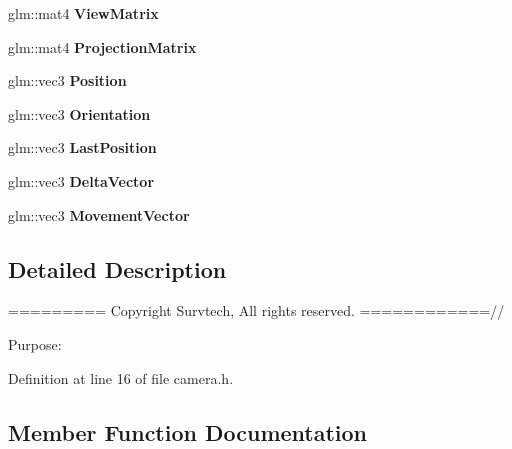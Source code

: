 \begin{DoxyCompactItemize}
\item 
glm\+::mat4 {\bfseries View\+Matrix}\hypertarget{class_camera_a34f22e4635ee38206e4b9c59095d43bf}{}\label{class_camera_a34f22e4635ee38206e4b9c59095d43bf}

\item 
glm\+::mat4 {\bfseries Projection\+Matrix}\hypertarget{class_camera_a8f5424b6795715c8a44805d1c3a5b11c}{}\label{class_camera_a8f5424b6795715c8a44805d1c3a5b11c}

\item 
glm\+::vec3 {\bfseries Position}\hypertarget{class_camera_a9733b59f5340f6f1bca24d52a6679039}{}\label{class_camera_a9733b59f5340f6f1bca24d52a6679039}

\item 
glm\+::vec3 {\bfseries Orientation}\hypertarget{class_camera_ab998c79a8bcbd71dcaad201f536e36e1}{}\label{class_camera_ab998c79a8bcbd71dcaad201f536e36e1}

\item 
glm\+::vec3 {\bfseries Last\+Position}\hypertarget{class_camera_a274def711ceb63556a3074da11fb43df}{}\label{class_camera_a274def711ceb63556a3074da11fb43df}

\item 
glm\+::vec3 {\bfseries Delta\+Vector}\hypertarget{class_camera_a92ea5380dd9962b451e067fe1c3c81dc}{}\label{class_camera_a92ea5380dd9962b451e067fe1c3c81dc}

\item 
glm\+::vec3 {\bfseries Movement\+Vector}\hypertarget{class_camera_a0d450752f3639989bc813bb077dd9f13}{}\label{class_camera_a0d450752f3639989bc813bb077dd9f13}

\end{DoxyCompactItemize}


\subsection{Detailed Description}
========= Copyright Survtech, All rights reserved. ============//

Purpose\+: 

 

Definition at line 16 of file camera.\+h.



\subsection{Member Function Documentation}
